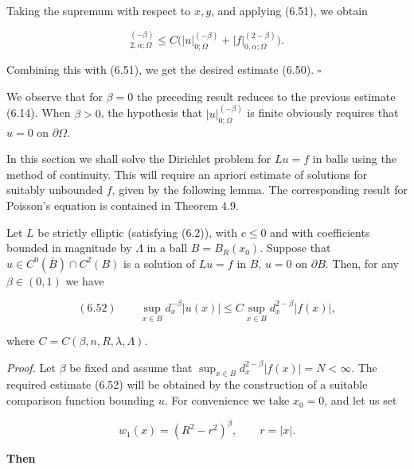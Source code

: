 Taking the supremum with respect to $x, y$, and applying (6.51), we obtain

\begin{equation*}
[u]_{2,\alpha;\Omega}^{(-\beta)}\leq C\bigl(\lvert u\rvert_{0;\Omega}^{(-\beta)}+\lvert f\rvert_{0,\alpha;\Omega}^{(2-\beta)}\bigr).
\end{equation*}

Combining this with (6.51), we get the desired estimate (6.50). $\square$

We observe that for $\beta=0$ the preceding result reduces to the previous estimate
(6.14). When $\beta>0$, the hypothesis that $\lvert u\rvert_{0;\Omega}^{(-\beta)}$ is finite obviously requires that
$u=0$ on $\partial\Omega$.

In this section we shall solve the Dirichlet problem for $Lu=f$ in balls using the
method of continuity. This will require an apriori estimate of solutions for suitably
unbounded $f$, given by the following lemma. The corresponding result for Poisson's
equation is contained in Theorem 4.9.

\begin{lemma}[6.21]
Let $L$ be strictly elliptic (satisfying (6.2)), with $c\leq 0$ and with coefficients bounded in magnitude by $\Lambda$ in a ball $B=B_R(x_0)$. Suppose that $u\in C^0(\bar{B})\cap C^2(B)$ is a solution of $Lu=f$ in $B$, $u=0$ on $\partial B$. Then, for any $\beta\in(0,1)$ we have
\end{lemma}

\begin{equation}
(6.52)\qquad \sup_{x\in B}d_x^{-\beta}\lvert u(x)\rvert\leq C\sup_{x\in B}d_x^{2-\beta}\lvert f(x)\rvert,
\end{equation}

where $C=C(\beta,n,R,\lambda,\Lambda)$.


\begin{flushleft}
\emph{Proof.} Let $\beta$ be fixed and assume that $\sup_{x\in B} d_x^{2-\beta}\lvert f(x)\rvert = N < \infty$. The required
estimate (6.52) will be obtained by the construction of a suitable comparison
function bounding $u$. For convenience we take $x_0=0$, and let us set
\end{flushleft}

\[
w_1(x)=(R^2-r^2)^\beta,\qquad r=\lvert x\rvert.
\]

\begin{flushleft}
\textbf{Then}
\end{flushleft}

